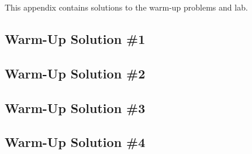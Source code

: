 This appendix contains solutions to the warm-up problems and lab.

\subsection{Warm-Up Solution \#1}
\label{app:warm-up-solution-1}


\subsection{Warm-Up Solution \#2}
\label{app:warm-up-solution-2}


\subsection{Warm-Up Solution \#3}
\label{app:warm-up-solution-3}


\subsection{Warm-Up Solution \#4}
\label{app:warm-up-solution-4}
